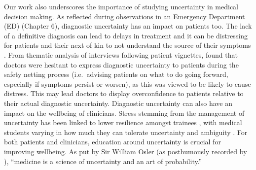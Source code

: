 \documentclass[a4paper, nobind]{templates/ociamthesis}
\begin{document}
Our work also underscores the importance of studying uncertainty in medical decision making. As reflected during observations in an Emergency Department (ED) (Chapter 6), diagnostic uncertainty has an impact on patients too. The lack of a definitive diagnosis can lead to delays in treatment and it can be distressing for patients and their next of kin to not understand the source of their symptoms \autocite{dahm2023}. From thematic analysis of interviews following patient vignettes, \textcite{cox_role_2024} found that doctors were hesitant to express diagnostic uncertainty to patients during the safety netting process (i.e.~advising patients on what to do going forward, especially if symptoms persist or worsen), as this was viewed to be likely to cause distress. This may lead doctors to display overconfidence to patients relative to their actual diagnostic uncertainty. Diagnostic uncertainty can also have an impact on the wellbeing of clinicians. Stress stemming from the management of uncertainty has been linked to lower resilience amongst trainees \autocite{simpkin_stress_2018}, with medical students varying in how much they can tolerate uncertainty and ambiguity \autocite{hancock_tolerance_2020}. For both patients and clinicians, education around uncertainty is crucial for improving wellbeing. As put by Sir William Osler (as posthumously recorded by \textcite{bean1954}), ``medicine is a science of uncertainty and an art of probability.''
\end{document}
